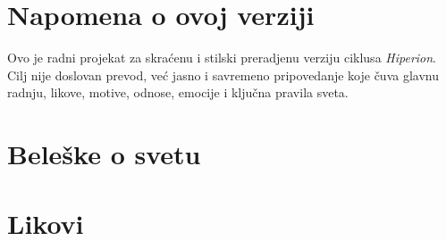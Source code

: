 \documentclass[11pt,twoside,openany]{book}
\begin{document}
\makehyperioncover

\frontmatter
\tableofcontents

\chapter*{Napomena o ovoj verziji}
Ovo je radni projekat za skraćenu i stilski preradjenu verziju ciklusa \textit{Hiperion}. Cilj nije doslovan prevod, već jasno i savremeno pripovedanje koje čuva glavnu radnju, likove, motive, odnose, emocije i ključna pravila sveta.

\mainmatter





\backmatter
\chapter*{Beleške o svetu}


\chapter*{Likovi}


\makehyperionback
\end{document}
